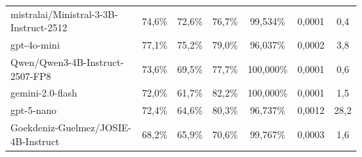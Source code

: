 \documentclass{IEEEphot}
\begin{document}
\begin{table}[t]
\begin{tabular}{|l|c|c|c|c|c|c|}
mistralai/Ministral-3-3B-Instruct-2512                                                                    & 74,6\%                                                              & 72,6\%        & 76,7\%           & 99,534\%                                                           & 0,0001                                                              & 0,4                                                                   \\
gpt-4o-mini                                                                                               & 77,1\%                                                              & 75,2\%        & 79,0\%           & 96,037\%                                                           & 0,0002                                                              & 3,8                                                                   \\
Qwen/Qwen3-4B-Instruct-2507-FP8                                                                           & 73,6\%                                                              & 69,5\%        & 77,7\%           & 100,000\%                                                          & 0,0001                                                              & 0,6                                                                   \\
gemini-2.0-flash                                                                                          & 72,0\%                                                              & 61,7\%        & 82,2\%           & 100,000\%                                                          & 0,0001                                                              & 1,5                                                                   \\
gpt-5-nano                                                                                                & 72,4\%                                                              & 64,6\%        & 80,3\%           & 96,737\%                                                           & 0,0012                                                              & 28,2                                                                  \\
Goekdeniz-Guelmez/JOSIE-4B-Instruct                                                                       & 68,2\%                                                              & 65,9\%        & 70,6\%           & 99,767\%                                                           & 0,0003                                                              & 1,6                                                                   \\

\end{tabular}
\end{table}
\end{document}
